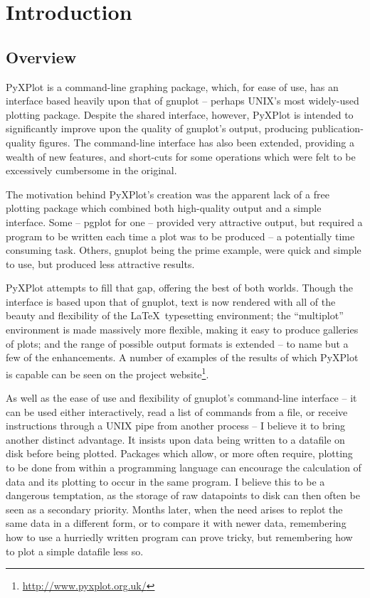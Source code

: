 \chapter{Introduction}

\label{introduction}

\section{Overview}

PyXPlot is a command-line graphing package, which, for ease of use, has an
interface based heavily upon that of gnuplot -- perhaps UNIX's most widely-used
plotting package. Despite the shared interface, however, PyXPlot is intended to
significantly improve upon the quality of gnuplot's output, producing
publication-quality figures. The command-line interface has also been extended,
providing a wealth of new features, and short-cuts for some operations which
were felt to be excessively cumbersome in the original.

The motivation behind PyXPlot's creation was the apparent lack of a free
plotting package which combined both high-quality output and a simple
interface.  Some -- pgplot for one -- provided very attractive output, but
required a program to be written each time a plot was to be produced -- a
potentially time consuming task. Others, gnuplot being the prime example, were
quick and simple to use, but produced less attractive results.

PyXPlot attempts to fill that gap, offering the best of both worlds. Though the
interface is based upon that of gnuplot, text is now rendered with all of the
beauty and flexibility of the \LaTeX\ typesetting environment; the
``multiplot'' environment is made massively more flexible, making it easy to
produce galleries of plots; and the range of possible output formats is
extended -- to name but a few of the enhancements. A number of examples of the
results of which PyXPlot is capable can be seen on the project
website\footnote{\url{http://www.pyxplot.org.uk/}}.

As well as the ease of use and flexibility of gnuplot's command-line interface
-- it can be used either interactively, read a list of commands from a file, or
receive instructions through a UNIX pipe from another process -- I believe it
to bring another distinct advantage. It insists upon data being written to a
datafile on disk before being plotted. Packages which allow, or more often
require, plotting to be done from within a programming language can encourage
the calculation of data and its plotting to occur in the same program. I
believe this to be a dangerous temptation, as the storage of raw datapoints to
disk can then often be seen as a secondary priority. Months later, when the
need arises to replot the same data in a different form, or to compare it with
newer data, remembering how to use a hurriedly written program can prove
tricky, but remembering how to plot a simple datafile less so.

